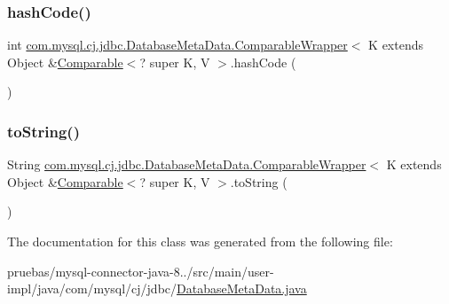 \subsubsection{\texorpdfstring{hash\+Code()}{hashCode()}}
{\footnotesize\ttfamily int \mbox{\hyperlink{classcom_1_1mysql_1_1cj_1_1jdbc_1_1_database_meta_data_1_1_comparable_wrapper}{com.\+mysql.\+cj.\+jdbc.\+Database\+Meta\+Data.\+Comparable\+Wrapper}}$<$ K extends Object \&\mbox{\hyperlink{class_comparable}{Comparable}}$<$? super K, V $>$.hash\+Code (\begin{DoxyParamCaption}{ }\end{DoxyParamCaption})}

\mbox{\label{classcom_1_1mysql_1_1cj_1_1jdbc_1_1_database_meta_data_1_1_comparable_wrapper_a509b8dedeee279d61db71f16c39dd452}} 
\subsubsection{\texorpdfstring{to\+String()}{toString()}}
{\footnotesize\ttfamily String \mbox{\hyperlink{classcom_1_1mysql_1_1cj_1_1jdbc_1_1_database_meta_data_1_1_comparable_wrapper}{com.\+mysql.\+cj.\+jdbc.\+Database\+Meta\+Data.\+Comparable\+Wrapper}}$<$ K extends Object \&\mbox{\hyperlink{class_comparable}{Comparable}}$<$? super K, V $>$.to\+String (\begin{DoxyParamCaption}{ }\end{DoxyParamCaption})}



The documentation for this class was generated from the following file\+:\begin{DoxyCompactItemize}
\item 
pruebas/mysql-\/connector-\/java-\/8../src/main/user-\/impl/java/com/mysql/cj/jdbc/\mbox{\hyperlink{_database_meta_data_8java}{Database\+Meta\+Data.\+java}}\end{DoxyCompactItemize}
